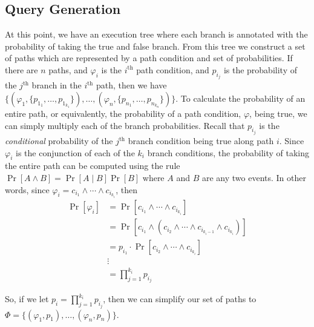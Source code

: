 \documentclass[acmsmall,review]{acmart}\settopmatter{}
\begin{document}
	\subsection{Query Generation}
	\label{sec:query_gen}
	
	At this point, we have an execution tree where each branch is annotated with the probability of taking the true and false branch.
	From this tree we construct a set of paths which are represented by a path condition and set of probabilities.
	If there are $n$ paths, and $\varphi_i$ is the $i^\text{th}$ path condition, and $p_{i_j}$ is the probability of the $j^{\text{th}}$ branch in the $i^{\text{th}}$ path, then we have $\{ (\varphi_1, \{p_{1_1},\ldots,p_{1_{k_1}}\}), \ldots, (\varphi_n, \{p_{n_1},\ldots,p_{n_{k_n}}\})\}$.
	To calculate the probability of an entire path, or equivalently, the probability of a path condition, $\varphi$, being true, we can simply multiply each of the branch probabilities.
	Recall that $p_{i_j}$ is the \textit{conditional} probability of the $j^{\text{th}}$ branch condition being true along path $i$.
	Since $\varphi_i$ is the conjunction of each of the $k_i$ branch conditions, the probability of taking the entire path can be computed using the rule $\Pr[A \wedge B] = \Pr[A \mid B]\Pr[B]$ where $A$ and $B$ are any two events.
	In other words, since $\varphi_i = c_{i_1} \wedge \cdots \wedge c_{i_{k_i}}$, then
	\begin{align*}
		\Pr[\varphi_i] &= \Pr[c_{i_1} \wedge \cdots \wedge c_{i_{k_i}}]\\
		&= \Pr[c_{i_1} \wedge (c_{i_2} \wedge \cdots \wedge c_{i_{{k_i}-1}} \wedge c_{i_{k_i}})]\\
		&= p_{i_1} \cdot \Pr[c_{i_2} \wedge \cdots \wedge c_{i_{k_i}}]\\
		&\vdots\\
		&= \displaystyle\prod_{j=1}^{k_i} p_{i_j}
	\end{align*}
	
	So, if we let $p_i = \prod_{j=1}^{k_i} p_{i_j}$, then we can simplify our set of paths to $\Phi = \{ (\varphi_1, p_1), \ldots, (\varphi_n, p_n)\}$.
	
\end{document}
